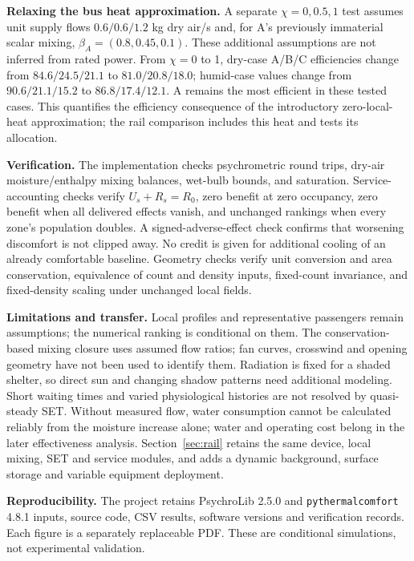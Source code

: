 \documentclass[12pt]{article}
\begin{document}
\noindent\textbf{Relaxing the bus heat approximation.} A separate $\chi=0,0.5,1$ test assumes unit supply flows $0.6/0.6/1.2$ kg dry air/s and, for A's previously immaterial scalar mixing, $\beta_A=(0.8,0.45,0.1)$. These additional assumptions are not inferred from rated power. From $\chi=0$ to 1, dry-case A/B/C efficiencies change from $84.6/24.5/21.1$ to $81.0/20.8/18.0$; humid-case values change from $90.6/21.1/15.2$ to $86.8/17.4/12.1$. A remains the most efficient in these tested cases. This quantifies the efficiency consequence of the introductory zero-local-heat approximation; the rail comparison includes this heat and tests its allocation.

\noindent\textbf{Verification.} The implementation checks psychrometric round trips, dry-air moisture/enthalpy mixing balances, wet-bulb bounds, and saturation. Service-accounting checks verify $U_s+R_s=R_0$, zero benefit at zero occupancy, zero benefit when all delivered effects vanish, and unchanged rankings when every zone's population doubles. A signed-adverse-effect check confirms that worsening discomfort is not clipped away. No credit is given for additional cooling of an already comfortable baseline. Geometry checks verify unit conversion and area conservation, equivalence of count and density inputs, fixed-count invariance, and fixed-density scaling under unchanged local fields.

\noindent\textbf{Limitations and transfer.} Local profiles and representative passengers remain assumptions; the numerical ranking is conditional on them. The conservation-based mixing closure uses assumed flow ratios; fan curves, crosswind and opening geometry have not been used to identify them. Radiation is fixed for a shaded shelter, so direct sun and changing shadow patterns need additional modeling. Short waiting times and varied physiological histories are not resolved by quasi-steady SET. Without measured flow, water consumption cannot be calculated reliably from the moisture increase alone; water and operating cost belong in the later effectiveness analysis. Section~\ref{sec:rail} retains the same device, local mixing, SET and service modules, and adds a dynamic background, surface storage and variable equipment deployment.

\noindent\textbf{Reproducibility.} The project retains PsychroLib 2.5.0 and \texttt{pythermalcomfort} 4.8.1 inputs, source code, CSV results, software versions and verification records. Each figure is a separately replaceable PDF. These are conditional simulations, not experimental validation.
\end{document}
